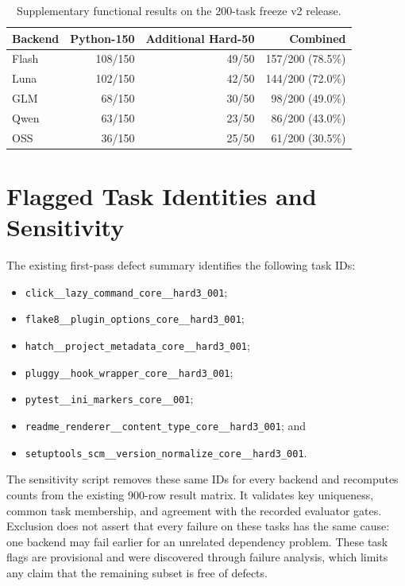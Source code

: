 \documentclass[acmsmall,screen,review,anonymous]{acmart}
\begin{document}
\begin{table}[h]
 \caption{Supplementary functional results on the 200-task freeze v2 release.}
 \label{tab:extension}
 \centering
 \begin{tabular}{@{}lrrr@{}}
 \toprule
 Backend & Python-150 & Additional Hard-50 & Combined \\
 \midrule
 Flash & 108/150 & 49/50 & 157/200 (78.5\%) \\
 Luna & 102/150 & 42/50 & 144/200 (72.0\%) \\
 GLM & 68/150 & 30/50 & 98/200 (49.0\%) \\
 Qwen & 63/150 & 23/50 & 86/200 (43.0\%) \\
 OSS & 36/150 & 25/50 & 61/200 (30.5\%) \\
 \bottomrule
 \end{tabular}
\end{table}

\section{Flagged Task Identities and Sensitivity}
\label{app:defects}

The existing first-pass defect summary identifies the following task IDs:
\begin{itemize}
 \item \texttt{click\_\_lazy\_command\_core\_\_hard3\_001};
 \item \texttt{flake8\_\_plugin\_options\_core\_\_hard3\_001};
 \item \texttt{hatch\_\_project\_metadata\_core\_\_hard3\_001};
 \item \texttt{pluggy\_\_hook\_wrapper\_core\_\_hard3\_001};
 \item \texttt{pytest\_\_ini\_markers\_core\_\_001};
 \item \texttt{readme\_renderer\_\_content\_type\_core\_\_hard3\_001}; and
 \item \texttt{setuptools\_scm\_\_version\_normalize\_core\_\_hard3\_001}.
\end{itemize}
The sensitivity script removes these same IDs for every backend and recomputes
counts from the existing 900-row result matrix. It validates key uniqueness,
common task membership, and agreement with the recorded evaluator gates.
Exclusion does not assert that every failure on these tasks has the same cause:
one backend may fail earlier for an unrelated dependency problem. These task
flags are provisional and were discovered through failure analysis, which
limits any claim that the remaining subset is free of defects.
\end{document}
